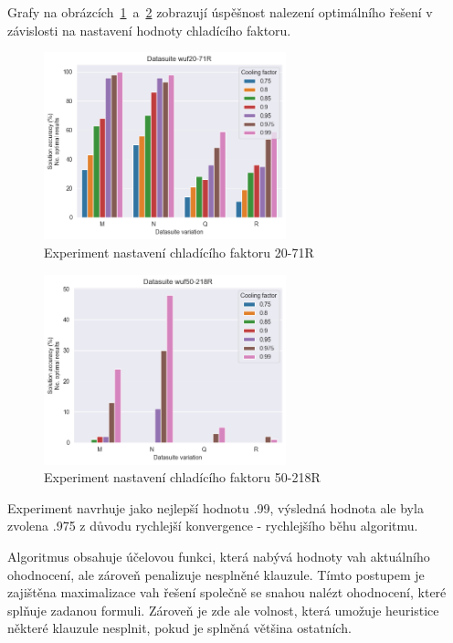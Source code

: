 \documentclass[twoside,twocolumn]{article}
\begin{document}
    Grafy na obrázcích~\ref{fig:cooling_factor_71}~a~\ref{fig:cooling_factor_218R} zobrazují úspěšnost nalezení
    optimálního řešení v závislosti na nastavení hodnoty chladícího faktoru.

    \begin{figure}
        \centering
        \includegraphics[width=7cm]{images/testing/cooling_factor/wuf20-71R}
        \caption{Experiment nastavení chladícího faktoru 20-71R}
        \label{fig:cooling_factor_71}
    \end{figure}

    \begin{figure}
        \centering
        \includegraphics[width=7cm]{images/testing/cooling_factor/wuf50-218R}
        \caption{Experiment nastavení chladícího faktoru 50-218R}
        \label{fig:cooling_factor_218R}
    \end{figure}

    Experiment navrhuje jako nejlepší hodnotu .99, výsledná hodnota ale byla zvolena .975 z důvodu rychlejší konvergence - rychlejšího běhu algoritmu.

    Algoritmus obsahuje účelovou funkci, která nabývá hodnoty vah aktuálního ohodnocení, ale zároveň penalizuje nesplněné klauzule.
    Tímto postupem je zajištěna maximalizace vah řešení společně se snahou nalézt ohodnocení, které splňuje zadanou formuli.
    Zároveň je zde ale volnost, která umožuje heuristice některé klauzule nesplnit, pokud je splněná většina ostatních.
\end{document}
